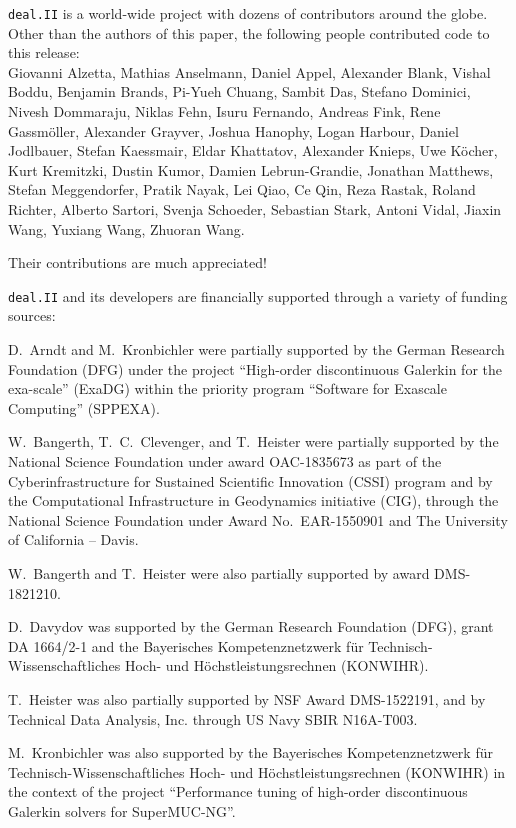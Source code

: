 \documentclass{ansarticle-preprint}
\newcommand{\specialword}[1]{\texttt{#1}}
\newcommand{\dealii}{{\specialword{deal.II}}\xspace}
\begin{document}
\dealii is a world-wide project with dozens of contributors around the
globe. Other than the authors of this paper, the following people
contributed code to this release:\\
  Giovanni Alzetta,
  Mathias Anselmann,
  Daniel Appel,
  Alexander Blank,
  Vishal Boddu,
  Benjamin Brands,
  Pi-Yueh Chuang,
  Sambit Das,
  Stefano Dominici,
  Nivesh Dommaraju,
  Niklas Fehn,
  Isuru Fernando,
  Andreas Fink,
  Rene Gassm{\"o}ller,
  Alexander Grayver,
  Joshua Hanophy,
  Logan Harbour,
  Daniel Jodlbauer,
  Stefan Kaessmair,
  Eldar Khattatov,
  Alexander Knieps,
  Uwe K{\"o}cher,
  Kurt Kremitzki,
  Dustin Kumor,
  Damien Lebrun-Grandie,
  Jonathan Matthews,
  Stefan Meggendorfer,
  Pratik Nayak,
  Lei Qiao,
  Ce Qin,
  Reza Rastak,
  Roland Richter,
  Alberto Sartori,
  Svenja Schoeder,
  Sebastian Stark,
  Antoni Vidal,
  Jiaxin Wang,
  Yuxiang Wang,
  Zhuoran Wang.

Their contributions are much appreciated!


\bigskip

\dealii and its developers are financially supported through a
variety of funding sources:

D.~Arndt and M.~Kronbichler were partially supported by the German
Research Foundation (DFG) under the project ``High-order discontinuous
Galerkin for the exa-scale'' (\mbox{ExaDG}) within the priority program ``Software
for Exascale Computing'' (SPPEXA).

W.~Bangerth, T.~C.~Clevenger, and T.~Heister were partially
supported by the National Science Foundation under award OAC-1835673
as part of the Cyberinfrastructure for Sustained Scientific Innovation (CSSI)
program  and by the Computational Infrastructure
in Geodynamics initiative (CIG), through the National Science
Foundation under Award No.~EAR-1550901 and The
University of California -- Davis.

W.~Bangerth and T.~Heister were also partially supported by award DMS-1821210.

D.~Davydov was supported by the German Research Foundation (DFG), grant DA
1664/2-1 and the Bayerisches Kompetenznetzwerk
f\"ur Technisch-Wissenschaftliches Hoch- und H\"ochstleistungsrechnen
(KONWIHR).

T.~Heister was also partially supported by NSF Award DMS-1522191, and
by Technical Data Analysis, Inc. through US Navy SBIR N16A-T003.

M.~Kronbichler was also supported by the Bayerisches Kompetenznetzwerk
f\"ur Technisch-Wissen\-schaft\-li\-ches Hoch- und H\"ochstleistungsrechnen
(KONWIHR) in the context of the project
``Performance tuning of high-order discontinuous Galerkin solvers for
SuperMUC-NG''.
\end{document}
